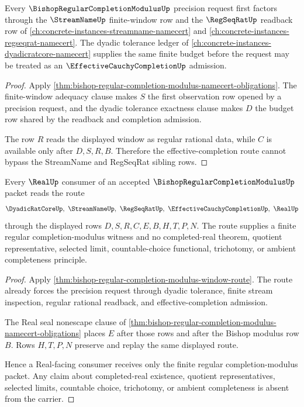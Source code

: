 \begin{theorem}
\label{thm:bishop-regular-completion-modulus-window-route}
Every $\BishopRegularCompletionModulusUp$ precision request first factors through the $\StreamNameUp$ finite-window row and the $\RegSeqRatUp$ readback row of \autoref{ch:concrete-instances-streamname-namecert} and \autoref{ch:concrete-instances-regseqrat-namecert}. The dyadic tolerance ledger of \autoref{ch:concrete-instances-dyadicratcore-namecert} supplies the same finite budget before the request may be treated as an $\EffectiveCauchyCompletionUp$ admission.
\end{theorem}
\begin{proof}
Apply \autoref{thm:bishop-regular-completion-modulus-namecert-obligations}. The finite-window adequacy clause makes $S$ the first observation row opened by a precision request, and the dyadic tolerance exactness clause makes $D$ the budget row shared by the readback and completion admission.

The row $R$ reads the displayed window as regular rational data, while $C$ is available only after $D,S,R,B$. Therefore the effective-completion route cannot bypass the StreamName and RegSeqRat sibling rows.
\end{proof}

\begin{theorem}
\label{thm:bishop-regular-completion-modulus-real-seal}
Every $\RealUp$ consumer of an accepted $\BishopRegularCompletionModulusUp$ packet reads the route
$$
\DyadicRatCoreUp,\ \StreamNameUp,\ \RegSeqRatUp,\ \EffectiveCauchyCompletionUp,\ \RealUp
$$
through the displayed rows $D,S,R,C,E,B,H,T,P,N$. The route supplies a finite regular completion-modulus witness and no completed-real theorem, quotient representative, selected limit, countable-choice functional, trichotomy, or ambient completeness principle.
\end{theorem}
\begin{proof}
Apply \autoref{thm:bishop-regular-completion-modulus-window-route}. The route already forces the precision request through dyadic tolerance, finite stream inspection, regular rational readback, and effective-completion admission.

The Real seal nonescape clause of \autoref{thm:bishop-regular-completion-modulus-namecert-obligations} places $E$ after those rows and after the Bishop modulus row $B$. Rows $H,T,P,N$ preserve and replay the same displayed route.

Hence a Real-facing consumer receives only the finite regular completion-modulus packet. Any claim about completed-real existence, quotient representatives, selected limits, countable choice, trichotomy, or ambient completeness is absent from the carrier.
\end{proof}


